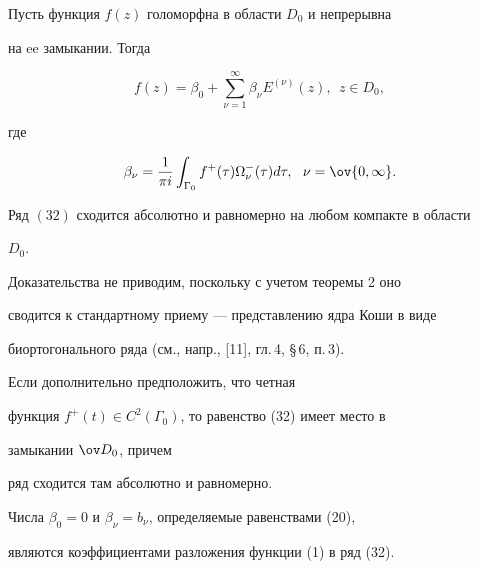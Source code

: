  


\begin{thm} 


Пусть функция $f(z)$ голоморфна в области $D_0$ и непрерывна 


на ee замыкании. Тогда 


\begin{equation} 


f(z)=\beta_0+\sum^\infty_{\nu=1}\beta_\nu E^{(\nu)}(z), 


\ \ z\in D_0, 


\end{equation} 


где 


$$ 


\beta_\nu=\frac{1}{\pi i}\int_{\Gamma_0} f^+(\tau) 


\Omega^-_\nu(\tau)d\tau,\ \ \nu=\ov{0,\infty}. 


$$ 


Ряд $(32)$ сходится абсолютно и равномерно на любом компакте в области 


$D_0$. 


\end{thm} 


 


Доказательства не приводим, поскольку с учетом теоремы 2 оно  


сводится к стандартному приему --- представлению ядра Коши в виде  


биортогонального ряда (см., напр., [11], гл.\,4, \S\,6, п.\,3). 


 


\begin{note} 


Если дополнительно предположить, что четная 


функция $f^+(t)\in C^2(\Gamma_0)$, то равенство (32) имеет место в 


замыкании $\ov D_0$, причем 


ряд сходится там абсолютно и равномерно. 


\end{note} 


 


\begin{note} 


Числа $\beta_0=0$ и $\beta_\nu=b_\nu$, определяемые равенствами (20),  


являются коэффициентами разложения функции (1) в ряд (32). 


\end{note} 


